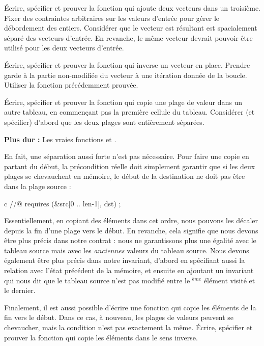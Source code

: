 Écrire, spécifier et prouver la fonction qui ajoute deux vecteurs dans un
troisième. Fixer des contraintes arbitraires sur les valeurs d'entrée pour
gérer le débordement des entiers. Considérer que le vecteur est résultant est
spacialement séparé des vecteurs d'entrée. En revanche, le même vecteur devrait
pouvoir être utilisé pour les deux vecteurs d'entrée.





Écrire, spécifier et prouver la fonction qui inverse un vecteur en place.
Prendre garde à la partie non-modifiée du vecteur à une itération donnée de la
boucle. Utiliser la fonction  précédemment prouvée.






Écrire, spécifier et prouver la fonction  qui copie une plage
de valeur dans un autre tableau, en commençant pas la première cellule du
tableau. Considérer (et spécifier) d'abord que les deux plages sont entièrement
séparées.





\textbf{Plus dur :} Les vraies fonctions  et
.


En fait, une séparation aussi forte n'est pas nécessaire. Pour faire une copie
en partant du début, la précondition réelle doit simplement garantir que si les
deux plages se chevauchent en mémoire, le début de la destination ne doit pas être
dans la plage source :


\begin{CodeBlock}{c}
//@ requires \separated(&src[0 .. len-1], dst) ;
\end{CodeBlock}


Essentiellement, en copiant des éléments dans cet ordre, nous pouvons les
décaler depuis la fin d'une plage vers le début. En revanche, cela signifie que
nous devons être plus précis dans notre contrat : nous ne garantissons plus une
égalité avec le tableau source mais avec les \emph{anciennes} valeurs du tableau
source. Nous devons également être plus précis dans notre invariant, d'abord en
spécifiant aussi la relation avec l'état précédent de la mémoire, et ensuite en
ajoutant un invariant qui nous dit que le tableau source n'est pas modifié entre
le $^{ème}$ élément visité et le dernier.


Finalement, il est aussi possible d'écrire une fonction qui copie les éléments de
la fin vers le début. Dans ce cas, à nouveau, les plages de valeurs peuvent se
chevaucher, mais la condition n'est pas exactement la même. Écrire, spécifier et
prouver la fonction  qui copie les éléments dans le
sens inverse.
